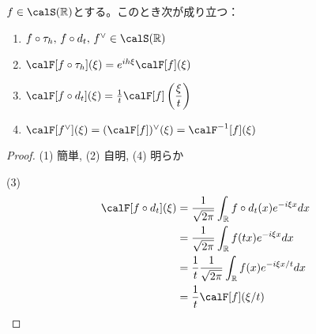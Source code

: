 \documentclass[report]{jlreq}
\begin{document}
\begin{proposition}
    $f \in \calS(\R)$とする。このとき次が成り立つ：
    \begin{enumerate}
        \item $f \circ \tau_h,\, f \circ d_t,\, f^{\vee} \in \calS(\R)$
        \item $\calF [f \circ \tau_h](\xi) = e^{ih\xi} \calF [f](\xi)$
        \item $\calF [f \circ d_t](\xi) = \frac{1}{t} \calF [f] \left(\dfrac{\xi}{t}\right)$
        \item $\calF [f^{\vee}](\xi) = (\calF [f])^{\vee} (\xi) = \calF^{-1} [f](\xi)$
    \end{enumerate}
\end{proposition}

\begin{proof}
    (1) 簡単, (2) 自明, (4) 明らか

    (3)
    \vspace{-2em}\begin{equation}
        \begin{split}
            \calF[f \circ d_t](\xi)
                &= \frac{1}{\sqrt{2\pi}} \int_\R f \circ d_t (x) e^{-i\xi x} dx \\
                &= \frac{1}{\sqrt{2\pi}} \int_\R f(tx) e^{-i\xi x} dx \\
                &= \frac{1}{t} \frac{1}{\sqrt{2\pi}} \int_\R f(x) e^{-i\xi x / t} dx \\
                &= \frac{1}{t} \calF[f] (\xi / t)
        \end{split}
    \end{equation}
\end{proof}
\end{document}
